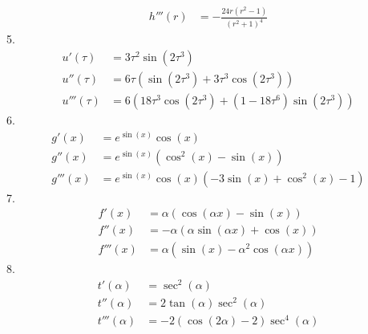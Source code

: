 \documentclass[11pt,answers]{exam}
\begin{document}
\begin{questions}
\begin{solution}
\begin{align*}
h'''(r)&=-\frac{24 r \left(r^2-1\right)}{\left(r^2+1\right)^4}
\end{align*}
5.
\begin{align*}
u'(\tau)&=3 \tau ^2 \sin \left(2 \tau ^3\right)
\\
u''(\tau)&=6 \tau  \left(\sin \left(2 \tau ^3\right)+3 \tau ^3 \cos \left(2 \tau ^3\right)\right)
\\
u'''(\tau)&=6 \left(18 \tau ^3 \cos \left(2 \tau ^3\right)+\left(1-18 \tau ^6\right) \sin \left(2 \tau
   ^3\right)\right)
\end{align*}
6.
\begin{align*}
g'(x)&=e^{\sin (x)} \cos (x)
\\
g''(x)&=e^{\sin (x)} \left(\cos ^2(x)-\sin (x)\right)
\\
g'''(x)&=e^{\sin (x)} \cos (x) \left(-3 \sin (x)+\cos ^2(x)-1\right)
\end{align*}
7.
\begin{align*}
f'(x)&=\alpha  (\cos (\alpha  x)-\sin (x))
\\
f''(x)&=-\alpha  (\alpha  \sin (\alpha  x)+\cos (x))
\\
f'''(x)&=\alpha  \left(\sin (x)-\alpha ^2 \cos (\alpha  x)\right)
\end{align*}
8.
\begin{align*}
t'(\alpha)&=\sec ^2(\alpha )
\\
t''(\alpha)&=2 \tan (\alpha ) \sec ^2(\alpha )
\\
t'''(\alpha)&=-2 (\cos (2 \alpha )-2) \sec ^4(\alpha )
\end{align*}
\end{solution}





\end{questions}
\end{document}
